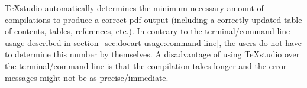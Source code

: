 		\begin{daInfoBox}
			TeXstudio automatically determines the minimum necessary amount of compilations to produce a correct pdf output (including a correctly updated table of contents, tables, references, etc.). In contrary to the terminal/command line usage described in \mbox{section \ref{sec:docart-usage:command-line}}, the users do not have to determine this number by themselves. A disadvantage of using TeXstudio over the terminal/command line is that the compilation takes longer and the error messages might not be as precise/immediate.
		\end{daInfoBox}
	
%	